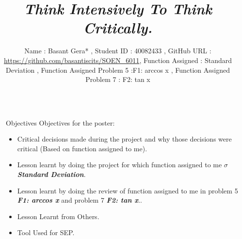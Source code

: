 \documentclass[final]{beamer}
\title{\textit{Think Intensively To Think Critically.}} %
\author{Name : Basant Gera*  ,  Student ID : 40082433 , GitHub URL : \url{https://github.com/basantiscits/SOEN\_6011}, Function Assigned : Standard Deviation , Function Assigned Problem 5 :F1: arccos x , Function Assigned Problem 7 : F2: tan x} %
\institute{Submitted to Pankaj Kamthan*} %
\newlength{\sepwid}
\newlength{\onecolwid}
\begin{document}

\setlength{\belowcaptionskip}{2ex} %
\setlength\belowdisplayshortskip{2ex} %

\begin{frame}[t] %

\begin{columns}[t] %

\begin{column}{\sepwid}\end{column} %

\begin{column}{\onecolwid} %


\begin{alertblock}{Objectives}
Objectives for the poster:
\begin{itemize}
\item Critical decisions made during the project and why those decisions were critical (Based on function assigned to me).
\item Lesson learnt by doing the project for which function assigned to me $\sigma$ \textbf{\textit{Standard Deviation}}.
\item Lesson learnt by doing the review of function assigned to me in problem 5  \textbf{\textit{ F1: arccos x}} and problem 7  \textbf{\textit{F2: tan x}}..
\item Lesson Learnt from Others.
\item Tool Used for SEP.
\end{itemize}
\end{alertblock}



\end{column}
\end{columns}
\end{frame}
\end{document}
